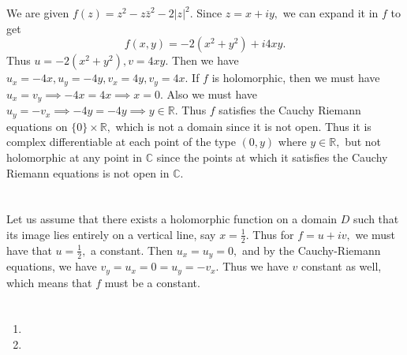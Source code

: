 \documentclass{article}
\title{} %
\author{Gandhar Kulkarni (mmat2304)} %
\date{} %
\begin{document}
\maketitle %


\section{} %
We are given $f(z)=z^2-z\bar{z}^2-2|z|^2.$ Since $z=x+iy,$ we can expand it in $f$ to get 
$$f(x,y)=-2(x^2+y^2)+i4xy.$$ Thus $u=-2(x^2+y^2),v=4xy.$ Then we have $u_x=-4x,u_y=-4y,v_x=4y,v_y=4x.$
If $f$ is holomorphic, then we must have $u_x=v_y \implies -4x=4x \implies x=0.$ Also we must have $u_y=-v_x \implies -4y=-4y \implies y \in \mathbb{R}.$
Thus $f$ satisfies the Cauchy Riemann equations on $\{0\} \times \mathbb{R},$ which is not a domain since it is not open. Thus it is complex differentiable 
at each point of the type $(0,y)$ where $y \in \mathbb{R},$ but not holomorphic at any point in $\mathbb{C}$ since the points at which it satisfies the 
Cauchy Riemann equations is not open in $\mathbb{C}.$ 
\section{} %
Let us assume that there exists a holomorphic function on a domain $D$ such that its image lies entirely on a vertical line, say $x=\frac{1}{2}$.
Thus for $f=u+iv,$ we must have that $u=\frac{1}{2},$ a constant. Then $u_x=u_y=0,$ and by the Cauchy-Riemann equations, we have $v_y=u_x=0=u_y=-v_x.$ Thus 
we have $v$ constant as well, which means that $f$ must be a constant.  
\section{} %

\section{} %
\section{} %
\begin{enumerate}
	\item 
	\item 
	
\end{enumerate}
\end{document}
